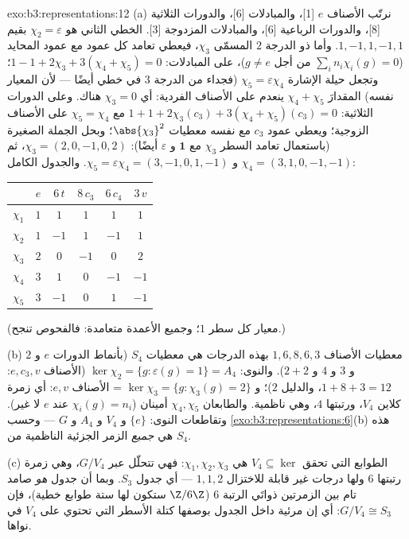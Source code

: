 \begin{solution}{exo:b3:representations:12}
(a) نرتّب الأصناف $e$ [1]، والمبادلات [6]، والدورات الثلاثية
[8]، والدورات الرباعية [6]، والمبادلات المزدوجة [3]. 
الخطي الثاني هو $\chi_2 = \varepsilon$ بقيم $1, -1, 1, -1, 1$. وأما  ذو الدرجة $2$
المسمّى $\chi_3$، فيعطي تعامد كل عمود مع عمود المحايد ($\sum_in_i\chi_i(g) = 0$
من أجل $g \neq e$)، على المبادلات: $1 - 1 + 2\chi_3 + 3(\chi_4 +
\chi_5) = 0$؛ وتجعل حيلة الإشارة
$\chi_5 = \varepsilon\chi_4$ (فجداء  من الدرجة $3$ في  خطي 
أيضًا --- لأن المعيار نفسه) المقدارَ $\chi_4 + \chi_5$ ينعدم على الأصناف
الفردية: أي $\chi_3 = 0$ هناك. وعلى الدورات الثلاثية: $1 + 1 +
2\chi_3(c_3) + 3(\chi_4 + \chi_5)(c_3) = 0$
مع $\chi_5 = \chi_4$ على الأصناف الزوجية؛ ويعطي عمود $c_3$ مع نفسه
معطيات $\abs{\chi_3}^2$؛ وبحل الجملة الصغيرة (باستعمال تعامد
السطر $\chi_3$ مع $\mathbf 1$ و $\varepsilon$ أيضًا): $\chi_3 = (2, 0, -1, 0, 2)$،
ثم $\chi_4 =
(3, 1, 0, -1, -1)$ و $\chi_5 = \varepsilon\chi_4 = (3, -1,
0, 1, -1)$. والجدول الكامل:
\begin{center}
\begin{tabular}{c|ccccc}
 & $e$ & $6\,t$ & $8\,c_3$ & $6\,c_4$ & $3\,v$\\
\hline
$\chi_1$ & $1$ & $1$ & $1$ & $1$ & $1$\\
$\chi_2$ & $1$ & $-1$ & $1$ & $-1$ & $1$\\
$\chi_3$ & $2$ & $0$ & $-1$ & $0$ & $2$\\
$\chi_4$ & $3$ & $1$ & $0$ & $-1$ & $-1$\\
$\chi_5$ & $3$ & $-1$ & $0$ & $1$ & $-1$\\
\end{tabular}
\end{center}
(معيار كل سطر $1$؛ وجميع الأعمدة متعامدة: فالفحوص تنجح.)

(b) معطيات الأصناف $1, 6, 8, 6, 3$ بهذه الدرجات هي معطيات
$S_4$ (بأنماط الدورات $e$ و $2$ و $3$ و $4$ و $2{+}2$).
والنوى: $\ker\chi_2 = \{g : \varepsilon(g) = 1\} = A_4$ (الأصناف $e, c_3, v$: $1 + 8 + 3 = 12$،
والدليل $2$)؛ و $\ker\chi_3 = \{g : \chi_3(g) = 2\}$ = الأصناف $e, v$: أي زمرة كلاين $V_4$،
ورتبتها $4$، وهي ناظمية. والطابعان $\chi_4, \chi_5$ أمينان
($\chi_i(g) = n_i$ عند $e$ لا غير). وتقاطعات النوى: $\{e\}$ و $V_4$
و $A_4$ و $G$ --- وحسب \cref{exo:b3:representations:6}(b) هذه هي \emph{جميع} الزمر
الجزئية الناظمية من $S_4$.

(c) الطوابع التي تحقق $V_4 \subseteq \ker$ هي $\chi_1,
\chi_2, \chi_3$: فهي تتحلّل عبر
$G/V_4$، وهي زمرة رتبتها $6$ ولها درجات غير قابلة للاختزال
$1, 1, 2$ --- أي جدول $S_3$. وبما أن جدول  \emph{هو} صامد تام
بين الزمرتين ذواتَي الرتبة $6$ ($\Z/6\Z$ ستكون لها ستة طوابع
خطية)، فإن $G/V_4 \cong
S_3$: أي إن  مرئية داخل الجدول بوصفها
كتلة الأسطر التي تحتوي على $V_4$ في نواها.
\end{solution}

